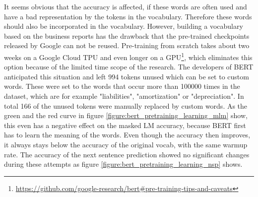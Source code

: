 It seems obvious that the accuracy is affected, if these words are often used and have a bad representation by the tokens in the vocabulary.
Therefore these words should also be incorporated in the vocabulary.
However, building a vocabulary based on the business reports has the drawback that the pre-trained checkpoints released by Google can not be reused.
Pre-training from scratch takes about two weeks on a Google Cloud TPU and even longer on a GPU\footnote{\url{https://github.com/google-research/bert\#pre-training-tips-and-caveats}}, which eliminates this option because of the limited time scope of the research.
The developers of \ac{BERT} anticipated this situation and left 994 tokens unused which can be set to custom words.
These were set to the words that occur more than 100000 times in the dataset, which are for example "liabilities", "amortization" or "depreciation".
In total 166 of the unused tokens were manually replaced by custom words.
As the green and the red curve in figure \ref{figure:bert_pretraining_learning_mlm} show, this even has a negative effect on the masked LM accuracy, because \ac{BERT} first has to learn the meaning of the words.
Even though the accuracy then improves, it always stays below the accuracy of the original vocab, with the same warmup rate.
The accuracy of the next sentence prediction showed no significant changes during these attempts as figure \ref{figure:bert_pretraining_learning_nsp} shows.

